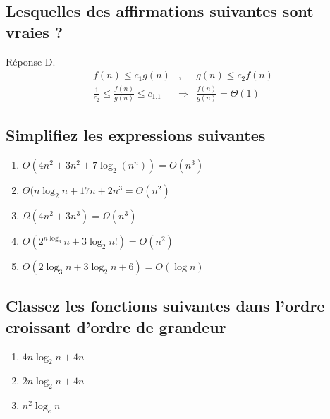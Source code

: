 \subsection{Lesquelles des affirmations suivantes sont vraies ?}
Réponse D. 
\begin{eqnarray*}
	f(n) \leq c_1 g(n)&,& g(n) \leq c_2 f(n)\\
	\frac{1}{c_2} \leq \frac{f(n)}{g(n)} \leq c_1.1 &\Rightarrow& \frac{f(n)}{g(n)} = \Theta(1)
\end{eqnarray*}
\subsection{Simplifiez les expressions suivantes}
\begin{enumerate}
	\item $O(4n^2+3n^2+7\log_2(n^n)) = O(n^3)$ 
	\item $\Theta(n\log_2 n + 17n + 2n^3 = \Theta (n^2)$ 
	\item $\Omega(4n^2 + 3n^3) = \Omega(n^3)$ 
	\item $O(2^{n\log_3}n + 3\log_2 n!) = O(n^2)$
	\item $O(2\log_3 n + 3\log_2 n + 6) = O(\log n)$
\end{enumerate}
\subsection{Classez les fonctions suivantes dans l'ordre croissant d'ordre de grandeur}
\begin{enumerate}
\item $4n \log_2 n + 4n$
\item $2n \log_2 n + 4n$
\item $n^2 \log_e n$
\end{enumerate}
